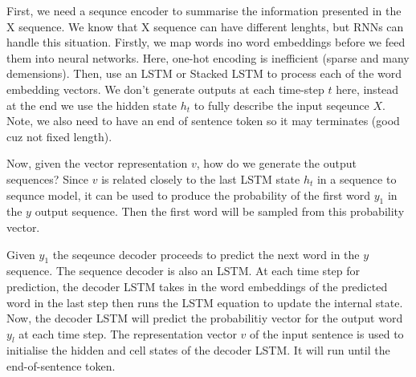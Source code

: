 \documentclass[11pt]{article}
\begin{document}
\begin{figure}[H]
    \centering
\end{figure}

First, we need a sequnce encoder to summarise the information presented in the X sequence. We know that X sequence can have different lenghts, but RNNs can handle this situation. Firstly, we map words ino word embeddings before we feed them into neural networks. Here, one-hot encoding is inefficient (sparse and many demensions). Then, use an LSTM or Stacked LSTM to process each of the word embedding vectors. We don't generate outputs at each time-step $t$ here, instead at the end we use the hidden state $h_t$ to fully describe the input seqeunce $X$. Note, we also need to have an end of sentence token so it may terminates (good cuz not fixed length).

\begin{figure}[H]
    \centering
\end{figure}

Now, given the vector representation $v$, how do we generate the output sequences? Since $v$ is related closely to the last LSTM state $h_t$ in a sequence to sequnce model, it can be used to produce the probability of the first word $y_1$ in the $y$ output sequence. Then the first word will be sampled from this probability vector.

Given $y_1$ the seqeunce decoder proceeds to predict the next word in the $y$ sequence. The sequence decoder is also an LSTM. At each time step for prediction, the decoder LSTM takes in the word embeddings of the predicted word in the last step then runs the LSTM equation to update the internal state. Now, the decoder LSTM will predict the probabilitiy vector for the output word $y_l$ at each time step. The representation vector $v$ of the input sentence is used to initialise the hidden and cell states of the decoder LSTM. It will run until the end-of-sentence token.
\end{document}
